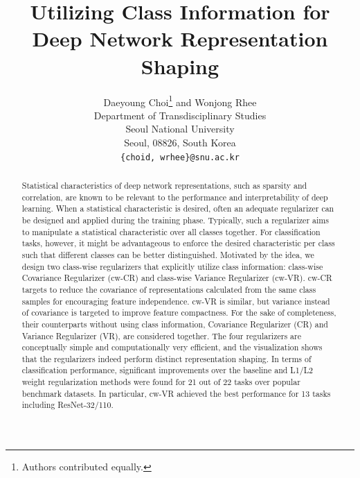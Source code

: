 %
\title{Utilizing Class Information for Deep Network Representation Shaping}

\author{Daeyoung Choi\thanks{Authors contributed equally.} and Wonjong Rhee\footnotemark[1] \\
Department of Transdisciplinary Studies\\
Seoul National University\\
Seoul, 08826, South Korea \\
\texttt{\{choid, wrhee\}@snu.ac.kr} 
}
\maketitle
\begin{abstract}
Statistical characteristics of deep network representations, such as sparsity and correlation, are known to be relevant to the performance and interpretability of deep learning. When a statistical characteristic is desired, often an adequate regularizer can be designed and applied during the training phase. Typically, such a regularizer aims to manipulate a statistical characteristic over all classes together. For classification tasks, however, it might be advantageous to enforce the desired characteristic per class such that different classes can be better distinguished. Motivated by the idea, we design two class-wise regularizers that explicitly utilize class information: class-wise Covariance Regularizer (cw-CR) and class-wise Variance Regularizer (cw-VR). cw-CR targets to reduce the covariance of representations calculated from the same class samples for encouraging feature independence. cw-VR is similar, but variance instead of covariance is targeted to improve feature compactness. For the sake of completeness, their counterparts without using class information, Covariance Regularizer (CR) and Variance Regularizer (VR), are considered together. The four regularizers are conceptually simple and computationally very efficient, and the visualization shows that the regularizers indeed perform distinct representation shaping. In terms of classification performance, significant improvements over the baseline and L1/L2 weight regularization methods were found for 21 out of 22 tasks over popular benchmark datasets. In particular, cw-VR achieved the best performance for 13 tasks including ResNet-32/110. 
\end{abstract}



